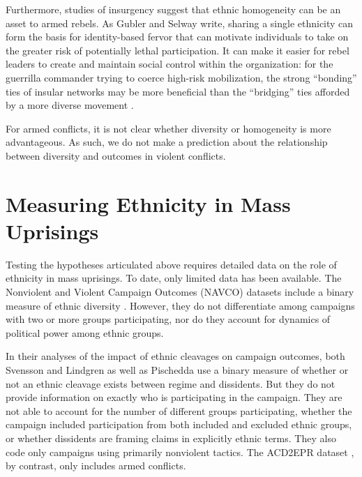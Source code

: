 \documentclass[
  letterpaper,
  DIV=11,
  numbers=noendperiod]{scrartcl}
\begin{document}
Furthermore, studies of insurgency suggest that ethnic homogeneity can
be an asset to armed rebels. As Gubler and Selway
\autocite*[209]{Gubler2012} write, sharing a single ethnicity can form
the basis for identity-based fervor that can motivate individuals to
take on the greater risk of potentially lethal participation. It can
make it easier for rebel leaders to create and maintain social control
within the organization: for the guerrilla commander trying to coerce
high-risk mobilization, the strong ``bonding'' ties of insular networks
may be more beneficial than the ``bridging'' ties afforded by a more
diverse movement \autocite{Thurber2021}.

For armed conflicts, it is not clear whether diversity or homogeneity is
more advantageous. As such, we do not make a prediction about the
relationship between diversity and outcomes in violent conflicts.

\subsection{}\label{section}

\section{Measuring Ethnicity in Mass
Uprisings}\label{measuring-ethnicity-in-mass-uprisings}

Testing the hypotheses articulated above requires detailed data on the
role of ethnicity in mass uprisings. To date, only limited data has been
available. The Nonviolent and Violent Campaign Outcomes (NAVCO) datasets
include a binary measure of ethnic diversity
\autocite{Chenoweth2013,Chenoweth2022}. However, they do not
differentiate among campaigns with two or more groups participating, nor
do they account for dynamics of political power among ethnic groups.

In their analyses of the impact of ethnic cleavages on campaign
outcomes, both Svensson and Lindgren \autocite*{Svensson2011} as well as
Pischedda \autocite*{Pischedda2020} use a binary measure of whether or
not an ethnic cleavage exists between regime and dissidents. But they do
not provide information on exactly who is participating in the campaign.
They are not able to account for the number of different groups
participating, whether the campaign included participation from both
included and excluded ethnic groups, or whether dissidents are framing
claims in explicitly ethnic terms. They also code only campaigns using
primarily nonviolent tactics. The ACD2EPR dataset
\autocite{Wucherpfennig2012}, by contrast, only includes armed
conflicts.
\end{document}
